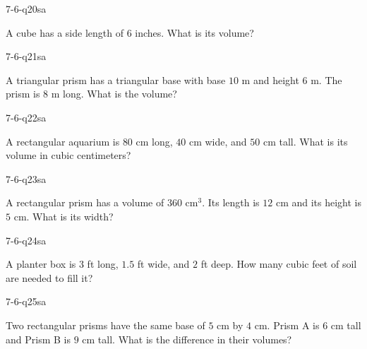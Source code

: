 \begin{practiceQuestion}{7-6-q20}{sa}
\begin{questionText}
A cube has a side length of $6$ inches. What is its volume?
\end{questionText}
\end{practiceQuestion}

\begin{practiceQuestion}{7-6-q21}{sa}
\begin{questionText}
A triangular prism has a triangular base with base $10$ m and height $6$ m. The prism is $8$ m long. What is the volume?
\end{questionText}
\end{practiceQuestion}

\begin{practiceQuestion}{7-6-q22}{sa}
\begin{questionText}
A rectangular aquarium is $80$ cm long, $40$ cm wide, and $50$ cm tall. What is its volume in cubic centimeters?
\end{questionText}
\end{practiceQuestion}

\begin{practiceQuestion}{7-6-q23}{sa}
\begin{questionText}
A rectangular prism has a volume of $360$ cm$^3$. Its length is $12$ cm and its height is $5$ cm. What is its width?
\end{questionText}
\end{practiceQuestion}

\begin{practiceQuestion}{7-6-q24}{sa}
\begin{questionText}
A planter box is $3$ ft long, $1.5$ ft wide, and $2$ ft deep. How many cubic feet of soil are needed to fill it?
\end{questionText}
\end{practiceQuestion}

\begin{practiceQuestion}{7-6-q25}{sa}
\begin{questionText}
Two rectangular prisms have the same base of $5$ cm by $4$ cm. Prism A is $6$ cm tall and Prism B is $9$ cm tall. What is the difference in their volumes?
\end{questionText}
\end{practiceQuestion}

